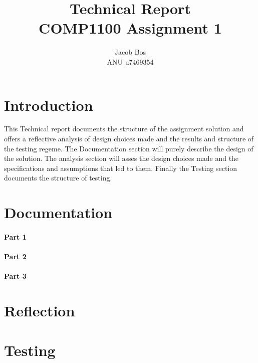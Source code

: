 \documentclass[11pt]{article}
\title{Technical Report\\ COMP1100 Assignment 1}
\author{Jacob Bos\\ ANU u7469354}
\begin{document}
\maketitle
\section*{Introduction} 
This Technical report documents the structure of the assignment solution and offers a reflective analysis of design choices made and the results and structure of the testing regeme. The Documentation section will purely describe the design of the solution. The analysis section will asses the design choices made and the specifications and assumptions that led to them. Finally the Testing section documents the structure of testing. 


\section{Documentation}%
\paragraph{Part 1}
\paragraph{Part 2}
\paragraph{Part 3}


\section{Reflection}%



\section{Testing}%
\end{document}
